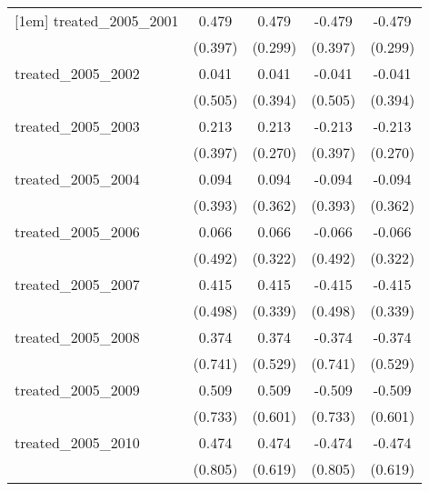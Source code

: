 {\begin{tabular}{l*{4}{c}}
[1em]
treated\_2005\_2001&       0.479         &       0.479         &      -0.479         &      -0.479         \\
            &     (0.397)         &     (0.299)         &     (0.397)         &     (0.299)         \\
[1em]
treated\_2005\_2002&       0.041         &       0.041         &      -0.041         &      -0.041         \\
            &     (0.505)         &     (0.394)         &     (0.505)         &     (0.394)         \\
[1em]
treated\_2005\_2003&       0.213         &       0.213         &      -0.213         &      -0.213         \\
            &     (0.397)         &     (0.270)         &     (0.397)         &     (0.270)         \\
[1em]
treated\_2005\_2004&       0.094         &       0.094         &      -0.094         &      -0.094         \\
            &     (0.393)         &     (0.362)         &     (0.393)         &     (0.362)         \\
[1em]
treated\_2005\_2006&       0.066         &       0.066         &      -0.066         &      -0.066         \\
            &     (0.492)         &     (0.322)         &     (0.492)         &     (0.322)         \\
[1em]
treated\_2005\_2007&       0.415         &       0.415         &      -0.415         &      -0.415         \\
            &     (0.498)         &     (0.339)         &     (0.498)         &     (0.339)         \\
[1em]
treated\_2005\_2008&       0.374         &       0.374         &      -0.374         &      -0.374         \\
            &     (0.741)         &     (0.529)         &     (0.741)         &     (0.529)         \\
[1em]
treated\_2005\_2009&       0.509         &       0.509         &      -0.509         &      -0.509         \\
            &     (0.733)         &     (0.601)         &     (0.733)         &     (0.601)         \\
[1em]
treated\_2005\_2010&       0.474         &       0.474         &      -0.474         &      -0.474         \\
            &     (0.805)         &     (0.619)         &     (0.805)         &     (0.619)         \\

\end{tabular}}
